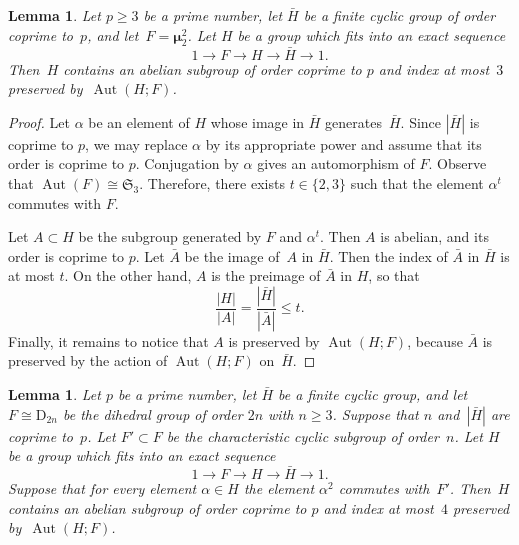 \documentclass[12pt]{amsart}
\numberwithin{equation}{section}
\newtheorem{lemma}[subsection]{Lemma}
\theoremstyle{definition}
\newcommand{\mumu}{\boldsymbol{\mu}}
\newcommand{\DD}{\mathrm D}
\DeclareMathOperator{\Aut}{Aut}
\def \ge {\geqslant}
\def \le {\leqslant}
\begin{document}
\begin{lemma}\label{lemma:small-dihedral-group-extension}
Let $p\ge 3$ be a prime number, let $\bar{H}$ be a finite cyclic group of order coprime to~$p$,
and let~\mbox{$F=\mumu_2^2$}.
Let $H$ be a group which fits into an exact sequence
$$
1\to F\to H\to \bar{H}\to 1.
$$
Then~$H$ contains an abelian subgroup of order coprime to $p$
and index at most~$3$ preserved by~\mbox{$\Aut(H;F)$}.
\end{lemma}

\begin{proof}
Let $\alpha$ be an element of $H$ whose image in $\bar{H}$ generates~$\bar{H}$.
Since $|\bar{H}|$ is coprime to $p$, we may replace $\alpha$ by its appropriate power and assume that its order is coprime to $p$.
Conjugation by $\alpha$ gives an automorphism of $F$.
Observe that $\Aut(F)\cong\mathfrak{S}_3$.
Therefore, there exists $t\in\{2,3\}$ such that
the element $\alpha^t$ commutes with $F$.


Let $A\subset H$ be the subgroup generated by $F$ and $\alpha^t$. Then $A$ is abelian, and its order is coprime to $p$.
Let $\bar{A}$ be the image of~$A$ in $\bar{H}$. Then the index of $\bar{A}$
in $\bar{H}$ is at most $t$. On the other hand, $A$ is the preimage
of $\bar{A}$ in $H$, so that
$$
\frac{|H|}{|A|}=\frac{|\bar{H}|}{|\bar{A}|}\le t.
$$
Finally, it remains to notice that $A$ is preserved by $\Aut(H;F)$,
because $\bar{A}$ is preserved by the action of $\Aut(H;F)$
on~$\bar{H}$.
\end{proof}

\begin{lemma}\label{lemma:dihedral-group-extension}
Let $p$ be a prime number, let $\bar{H}$ be a finite cyclic group,
and let~\mbox{$F\cong\DD_{2n}$} be the dihedral group of order $2n$ with $n\ge 3$.
Suppose that $n$ and~$|\bar{H}|$ are coprime to~$p$.
Let $F'\subset F$ be the characteristic
cyclic subgroup of order~$n$.
Let $H$ be a group which fits into an exact sequence
$$
1\to F\to H\to \bar{H}\to 1.
$$
Suppose that for every element $\alpha\in H$
the element $\alpha^2$ commutes with~$F'$.
Then~$H$ contains an abelian subgroup of order coprime to $p$
and index at most~$4$
preserved by~\mbox{$\Aut(H;F)$}.
\end{lemma}
\end{document}
